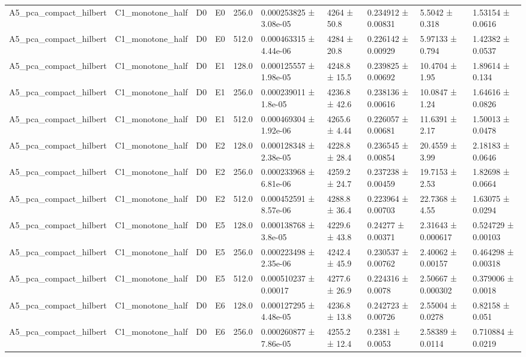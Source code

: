\begin{table}
\begin{tabular}{llllllllll}
A5\_pca\_compact\_hilbert & C1\_monotone\_half & D0 & E0 & 256.0 & 0.000253825 ± 3.08e-05 & 4264 ± 50.8 & 0.234912 ± 0.00831 & 5.5042 ± 0.318 & 1.53154 ± 0.0616 \\
A5\_pca\_compact\_hilbert & C1\_monotone\_half & D0 & E0 & 512.0 & 0.000463315 ± 4.44e-06 & 4284 ± 20.8 & 0.226142 ± 0.00929 & 5.97133 ± 0.794 & 1.42382 ± 0.0537 \\
A5\_pca\_compact\_hilbert & C1\_monotone\_half & D0 & E1 & 128.0 & 0.000125557 ± 1.98e-05 & 4248.8 ± 15.5 & 0.239825 ± 0.00692 & 10.4704 ± 1.95 & 1.89614 ± 0.134 \\
A5\_pca\_compact\_hilbert & C1\_monotone\_half & D0 & E1 & 256.0 & 0.000239011 ± 1.8e-05 & 4236.8 ± 42.6 & 0.238136 ± 0.00616 & 10.0847 ± 1.24 & 1.64616 ± 0.0826 \\
A5\_pca\_compact\_hilbert & C1\_monotone\_half & D0 & E1 & 512.0 & 0.000469304 ± 1.92e-06 & 4265.6 ± 4.44 & 0.226057 ± 0.00681 & 11.6391 ± 2.17 & 1.50013 ± 0.0478 \\
A5\_pca\_compact\_hilbert & C1\_monotone\_half & D0 & E2 & 128.0 & 0.000128348 ± 2.38e-05 & 4228.8 ± 28.4 & 0.236545 ± 0.00854 & 20.4559 ± 3.99 & 2.18183 ± 0.0646 \\
A5\_pca\_compact\_hilbert & C1\_monotone\_half & D0 & E2 & 256.0 & 0.000233968 ± 6.81e-06 & 4259.2 ± 24.7 & 0.237238 ± 0.00459 & 19.7153 ± 2.53 & 1.82698 ± 0.0664 \\
A5\_pca\_compact\_hilbert & C1\_monotone\_half & D0 & E2 & 512.0 & 0.000452591 ± 8.57e-06 & 4288.8 ± 36.4 & 0.223964 ± 0.00703 & 22.7368 ± 4.55 & 1.63075 ± 0.0294 \\
A5\_pca\_compact\_hilbert & C1\_monotone\_half & D0 & E5 & 128.0 & 0.000138768 ± 3.8e-05 & 4229.6 ± 43.8 & 0.24277 ± 0.00371 & 2.31643 ± 0.000617 & 0.524729 ± 0.00103 \\
A5\_pca\_compact\_hilbert & C1\_monotone\_half & D0 & E5 & 256.0 & 0.000223498 ± 2.35e-06 & 4242.4 ± 45.9 & 0.230537 ± 0.00762 & 2.40062 ± 0.00157 & 0.464298 ± 0.00318 \\
A5\_pca\_compact\_hilbert & C1\_monotone\_half & D0 & E5 & 512.0 & 0.000510237 ± 0.00017 & 4277.6 ± 26.9 & 0.224316 ± 0.0078 & 2.50667 ± 0.000302 & 0.379006 ± 0.0018 \\
A5\_pca\_compact\_hilbert & C1\_monotone\_half & D0 & E6 & 128.0 & 0.000127295 ± 4.48e-05 & 4236.8 ± 13.8 & 0.242723 ± 0.00726 & 2.55004 ± 0.0278 & 0.82158 ± 0.051 \\
A5\_pca\_compact\_hilbert & C1\_monotone\_half & D0 & E6 & 256.0 & 0.000260877 ± 7.86e-05 & 4255.2 ± 12.4 & 0.2381 ± 0.0053 & 2.58389 ± 0.0114 & 0.710884 ± 0.0219 \\

\end{tabular}
\end{table}
